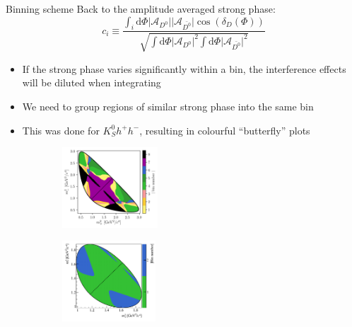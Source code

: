 \documentclass{beamer}
\begin{document}
\begin{frame}{Binning scheme}
  \vspace{0.0cm}
  {\large Back to the amplitude averaged strong phase:}
  \begin{equation*}
    c_i\equiv\frac{\int_i\mathrm{d}\Phi\lvert\mathcal{A}_{D^0}\lvert\lvert\mathcal{A}_{\bar{D^0}}\lvert\cos(\delta_D(\Phi))}{\sqrt{\int\mathrm{d}\Phi\lvert\mathcal{A}_{D^0}\lvert^2\int\mathrm{d}\Phi\lvert\mathcal{A}_{\bar{D^0}}\lvert^2}}
  \end{equation*}
  \begin{itemize}
    \setlength\itemsep{0.5em}
    \item{If the strong phase varies significantly within a bin, the interference effects will be diluted when integrating}
    \item{We need to group regions of similar strong phase into the same bin}
    \item{This was done for $K_S^0h^+h^-$, resulting in colourful ``butterfly'' plots}
  \end{itemize}
  \begin{figure}
    \centering
    \begin{subfigure}{0.45\textwidth}
      \centering
      \includegraphics[height = 3cm]{Plots/KsPiPi_optimal.png}
    \end{subfigure}%
    \begin{subfigure}{0.45\textwidth}
      \centering
      \includegraphics[height = 3cm]{Plots/KsKK_binning.png}
    \end{subfigure}
  \end{figure}
\end{frame}
\end{document}
